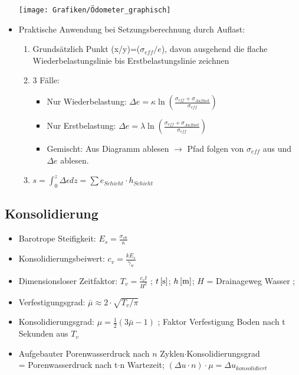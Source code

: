 \documentclass[fleqn,twoside]{article}
\newcommand{\un}[2]{{\unit[#1]{\color{black!100}[#2]}}}
\begin{document}
\begin{itemize}
\begin{minipage}{0.5\textwidth}
	\end{minipage}
	\begin{minipage}{0.5\textwidth}
	    \texttt{[image: Grafiken/Ödometer\_graphisch]}
	\end{minipage}
	\item Praktische Anwendung bei Setzungsberechnung durch Auflast:
	\begin{enumerate}
	    \item Grundsätzlich Punkt (x/y)=($\sigma_{eff}/e$), davon ausgehend die flache Wiederbelastungslinie bis Erstbelastungslinie zeichnen
	    \item 3 Fälle:
	    \begin{itemize}
	        \item Nur Wiederbelastung: $\Delta e = \kappa \ln(\frac{\sigma_{eff}+\sigma_{Auflast}}{\sigma_{eff}})$ 
	        \item Nur Erstbelastung: $\Delta e = \lambda \ln(\frac{\sigma_{eff}+\sigma_{Auflast}}{\sigma_{eff}})$
	        \item Gemischt: Aus Diagramm ablesen $\rightarrow$ Pfad folgen von $\sigma_{eff}$ aus und $\Delta e$ ablesen.
	    \end{itemize}
	    \item $s = \int_0^z \Delta \epsilon dz = \sum e_{Schicht} \cdot h_{Schicht} $
	\end{enumerate}
	
	
	
\end{itemize}

\subsection{Konsolidierung}

\begin{itemize}
	\item Barotrope Steifigkeit: $E_s=\frac{\sigma_{v0}}{\kappa}$
	\item Konsolidierungsbeiwert: $c_v=\frac{kE_s}{\gamma_w}$
	\item Dimensionsloser Zeitfaktor: $T_v=\frac{c_vt}{H^2}$ ; $\un{t}{s}$; $\un{h}{m}$; $H$ = Drainageweg Wasser ;
	\item Verfestigungsgrad: $\bar{\mu}\approx 2 \cdot \sqrt{T_v/\pi}$
	\item Konsolidierungsgrad: $\mu=\frac{1}{2}(3\bar{\mu}-1)$ ; Faktor Verfestigung Boden nach t Sekunden aus $T_v$
	\item Aufgebauter Porenwasserdruck nach $n$ Zyklen$\cdot$Konsolidierungsgrad \\= Porenwasserdruck nach t$\cdot$n Wartezeit; 
		$(\Delta u \cdot n) \cdot \mu = \Delta u_{konsolidiert}$
\end{itemize}
\end{document}
